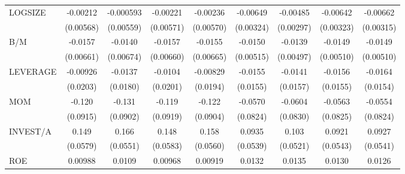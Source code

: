 \begin{table}[htbp]
\begin{tabular}{l*{8}{c}}
LOGSIZE             &    -0.00212         &   -0.000593         &    -0.00221         &    -0.00236         &    -0.00649\sym{**} &    -0.00485         &    -0.00642\sym{*}  &    -0.00662\sym{**} \\
                    &   (0.00568)         &   (0.00559)         &   (0.00571)         &   (0.00570)         &   (0.00324)         &   (0.00297)         &   (0.00323)         &   (0.00315)         \\
B/M                 &     -0.0157\sym{**} &     -0.0140\sym{**} &     -0.0157\sym{**} &     -0.0155\sym{**} &     -0.0150\sym{***}&     -0.0139\sym{***}&     -0.0149\sym{***}&     -0.0149\sym{***}\\
                    &   (0.00661)         &   (0.00674)         &   (0.00660)         &   (0.00665)         &   (0.00515)         &   (0.00497)         &   (0.00510)         &   (0.00510)         \\
LEVERAGE            &    -0.00926         &     -0.0137         &     -0.0104         &    -0.00829         &     -0.0155         &     -0.0141         &     -0.0156         &     -0.0164         \\
                    &    (0.0203)         &    (0.0180)         &    (0.0201)         &    (0.0194)         &    (0.0155)         &    (0.0157)         &    (0.0155)         &    (0.0154)         \\
MOM                 &      -0.120         &      -0.131         &      -0.119         &      -0.122         &     -0.0570         &     -0.0604         &     -0.0563         &     -0.0554         \\
                    &    (0.0915)         &    (0.0902)         &    (0.0919)         &    (0.0904)         &    (0.0824)         &    (0.0830)         &    (0.0825)         &    (0.0824)         \\
INVEST/A            &       0.149\sym{**} &       0.166\sym{***}&       0.148\sym{**} &       0.158\sym{***}&      0.0935\sym{*}  &       0.103\sym{*}  &      0.0921\sym{*}  &      0.0927\sym{*}  \\
                    &    (0.0579)         &    (0.0551)         &    (0.0583)         &    (0.0560)         &    (0.0539)         &    (0.0521)         &    (0.0543)         &    (0.0541)         \\
ROE                 &     0.00988         &      0.0109         &     0.00968         &     0.00919         &      0.0132         &      0.0135         &      0.0130         &      0.0126         \\

\end{tabular}
\end{table}
